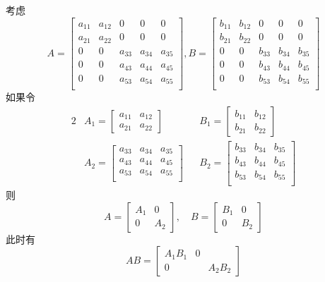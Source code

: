 \documentclass[11pt]{article}
\begin{document}
考虑
\begin{equation*}
A=
\begin{bmatrix}
a_{11}&a_{12}&0&0&0\\
a_{21}&a_{22}&0&0&0\\
0&0&a_{33}&a_{34}&a_{35}\\
0&0&a_{43}&a_{44}&a_{45}\\
0&0&a_{53}&a_{54}&a_{55}\\
\end{bmatrix},
B=
\begin{bmatrix}
b_{11}&b_{12}&0&0&0\\
b_{21}&b_{22}&0&0&0\\
0&0&b_{33}&b_{34}&b_{35}\\
0&0&b_{43}&b_{44}&b_{45}\\
0&0&b_{53}&b_{54}&b_{55}\\
\end{bmatrix}
\end{equation*}
如果令
\begin{alignat*}{2}
&A_1=
\begin{bmatrix}
a_{11}&a_{12}\\
a_{21}&a_{22}
\end{bmatrix}&&
B_1=
\begin{bmatrix}
b_{11}&b_{12}\\
b_{21}&b_{22}
\end{bmatrix}\\
&A_2=
\begin{bmatrix}
a_{33}&a_{34}&a_{35}\\
a_{43}&a_{44}&a_{45}\\
a_{53}&a_{54}&a_{55}\\
\end{bmatrix}
&&B_2=
\begin{bmatrix}
b_{33}&b_{34}&b_{35}\\
b_{43}&b_{44}&b_{45}\\
b_{53}&b_{54}&b_{55}\\
\end{bmatrix}
\end{alignat*}
则
\begin{equation*}
A=
\begin{bmatrix}
A_1&0\\0&A_2
\end{bmatrix},\quad
B=
\begin{bmatrix}
B_1&0\\0&B_2
\end{bmatrix}
\end{equation*}
此时有
\begin{equation*}
AB=
\begin{bmatrix}
A_1B_1&0\\0&&A_2B_2
\end{bmatrix}
\end{equation*}
\end{document}
